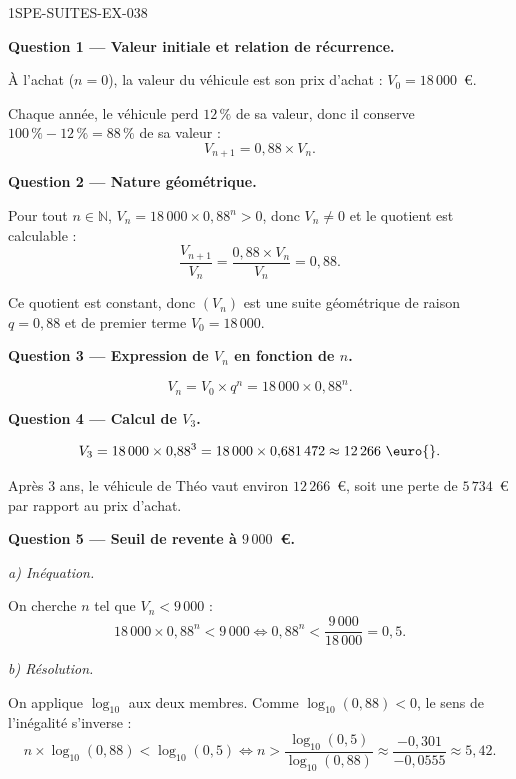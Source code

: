 \begin{corrige}{1SPE-SUITES-EX-038}

\textbf{Question 1 — Valeur initiale et relation de récurrence.}

À l'achat ($n = 0$), la valeur du véhicule est son prix d'achat : $V_0 = 18\,000$~\euro{}.

Chaque année, le véhicule perd $12\,\%$ de sa valeur, donc il conserve $100\,\% - 12\,\% = 88\,\%$ de sa valeur :
\[
  V_{n+1} = 0{,}88 \times V_n.
\]

\medskip
\textbf{Question 2 — Nature géométrique.}

Pour tout $n \in \mathbb{N}$, $V_n = 18\,000 \times 0{,}88^n > 0$, donc $V_n \neq 0$ et le quotient est calculable :
\[
  \frac{V_{n+1}}{V_n} = \frac{0{,}88 \times V_n}{V_n} = 0{,}88.
\]


Ce quotient est constant, donc $(V_n)$ est une suite géométrique de raison $q = 0{,}88$ et de premier terme $V_0 = 18\,000$.

\medskip
\textbf{Question 3 — Expression de $V_n$ en fonction de $n$.}

\[
  V_n = V_0 \times q^n = 18\,000 \times 0{,}88^n.
\]

\medskip
\textbf{Question 4 — Calcul de $V_3$.}

\[
  V_3 = 18\,000 \times 0{,}88^3 = 18\,000 \times 0{,}681\,472 \approx 12\,266 \text{ \euro{}}.
\]

Après $3$ ans, le véhicule de Théo vaut environ $12\,266$~\euro{}, soit une perte de $5\,734$~\euro{} par rapport au prix d'achat.

\medskip
\textbf{Question 5 — Seuil de revente à $9\,000$~\euro{}.}

\textit{a) Inéquation.}

On cherche $n$ tel que $V_n < 9\,000$ :
\[
  18\,000 \times 0{,}88^n < 9\,000 \iff 0{,}88^n < \frac{9\,000}{18\,000} = 0{,}5.
\]

\textit{b) Résolution.}

On applique $\log_{10}$ aux deux membres. Comme $\log_{10}(0{,}88) < 0$, le sens de l'inégalité s'inverse :
\[
  n \times \log_{10}(0{,}88) < \log_{10}(0{,}5) \iff n > \frac{\log_{10}(0{,}5)}{\log_{10}(0{,}88)} \approx \frac{-0{,}301}{-0{,}0555} \approx 5{,}42.
\]



\end{corrige}
